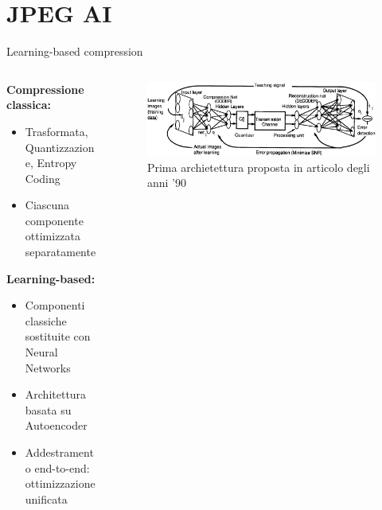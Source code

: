 \documentclass[11pt]{beamer}
\begin{document}
\section{JPEG AI}
\begin{frame}{Learning-based compression}
    \begin{columns}
        \begin{column}{0.4\textwidth}
        \textbf{Compressione classica:}
        \begin{itemize}
        \item Trasformata, Quantizzazione, Entropy Coding
        \item Ciascuna componente ottimizzata separatamente
        \end{itemize}
        \textbf{Learning-based:}
        \begin{itemize}
        \item Componenti classiche sostituite con Neural Networks
        \item Architettura basata su Autoencoder
        \item Addestramento end-to-end: ottimizzazione unificata
        \end{itemize}
        \end{column}
        \begin{column}{0.6\textwidth}
            \begin{figure}
                    \includegraphics[width=\linewidth]{assets/primo framework.png}
                    \caption{Prima archietettura proposta in articolo degli anni '90}
                    \label{fig:placeholder}
                \end{figure}
        \end{column}
    \end{columns}
\end{frame}
\end{document}
